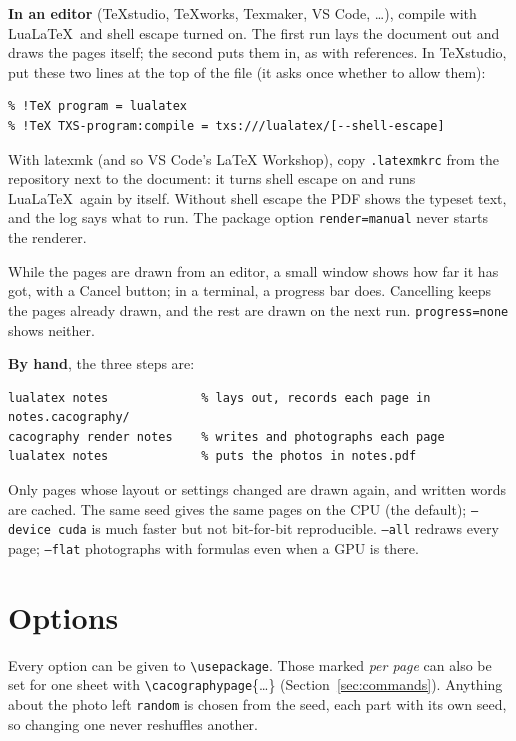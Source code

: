 \documentclass[11pt]{article}
\newcommand{\opt}[1]{\texttt{#1}}
\newcommand{\cs}[1]{\texttt{\textbackslash #1}}
\begin{document}
\textbf{In an editor} (TeXstudio, TeXworks, Texmaker, VS Code, \dots), compile with
Lua\LaTeX\ and shell escape turned on. The first run lays the document out and draws the
pages itself; the second puts them in, as with references. In TeXstudio, put these two lines
at the top of the file (it asks once whether to allow them):
\begin{lstlisting}
% !TeX program = lualatex
% !TeX TXS-program:compile = txs:///lualatex/[--shell-escape]
\end{lstlisting}
With latexmk (and so VS Code's LaTeX Workshop), copy \texttt{.latexmkrc} from the repository
next to the document: it turns shell escape on and runs Lua\LaTeX\ again by itself. Without
shell escape the PDF shows the typeset text, and the log says what to run. The package option
\opt{render=manual} never starts the renderer.

While the pages are drawn from an editor, a small window shows how far it has got, with a
Cancel button; in a terminal, a progress bar does. Cancelling keeps the pages already drawn,
and the rest are drawn on the next run. \opt{progress=none} shows neither.

\textbf{By hand}, the three steps are:
\begin{lstlisting}
lualatex notes             % lays out, records each page in notes.cacography/
cacography render notes    % writes and photographs each page
lualatex notes             % puts the photos in notes.pdf
\end{lstlisting}
Only pages whose layout or settings changed are drawn again, and written words are cached.
The same seed gives the same pages on the CPU (the default); \texttt{--device cuda} is much
faster but not bit-for-bit reproducible. \texttt{--all} redraws every page; \texttt{--flat}
photographs with formulas even when a GPU is there.

\section{Options}
Every option can be given to \cs{usepackage}. Those marked \emph{per page} can also be set
for one sheet with \cs{cacographypage}\{\dots\} (Section~\ref{sec:commands}). Anything about
the photo left \opt{random} is chosen from the seed, each part with its own seed, so changing
one never reshuffles another.
\end{document}
